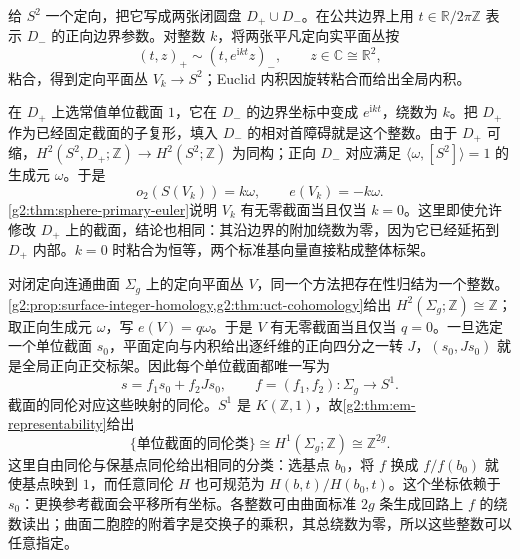 \begin{example}\label{g2:exm:clutched-plane-obstruction}
	给 \(S^2\) 一个定向，把它写成两张闭圆盘 \(D_+\cup D_-\)。在公共边界上用 \(t\in\mathbb R/2\pi\mathbb Z\) 表示 \(D_-\) 的正向边界参数。对整数 \(k\)，将两张平凡定向实平面丛按
	\[
		(t,z)_+\sim(t,e^{\mathrm i kt}z)_-,\qquad z\in\mathbb C\cong\mathbb R^2,
	\]
	粘合，得到定向平面丛 \(V_k\rightarrow S^2\)；Euclid 内积因旋转粘合而给出全局内积。

	在 \(D_+\) 上选常值单位截面 \(1\)，它在 \(D_-\) 的边界坐标中变成 \(e^{\mathrm i kt}\)，绕数为 \(k\)。把 \(D_+\) 作为已经固定截面的子复形，填入 \(D_-\) 的相对首障碍就是这个整数。由于 \(D_+\) 可缩，\(H^2(S^2,D_+;\mathbb Z)\rightarrow H^2(S^2;\mathbb Z)\) 为同构；正向 \(D_-\) 对应满足 \(\langle\omega,[S^2]\rangle=1\) 的生成元 \(\omega\)。于是
	\[
		o_2(S(V_k))=k\omega,\qquad e(V_k)=-k\omega.
	\]
	\cref{g2:thm:sphere-primary-euler}说明 \(V_k\) 有无零截面当且仅当 \(k=0\)。这里即使允许修改 \(D_+\) 上的截面，结论也相同：其沿边界的附加绕数为零，因为它已经延拓到 \(D_+\) 内部。\(k=0\) 时粘合为恒等，两个标准基向量直接粘成整体标架。
\end{example}

对闭定向连通曲面 \(\Sigma_g\) 上的定向平面丛 \(V\)，同一个方法把存在性归结为一个整数。\cref{g2:prop:surface-integer-homology,g2:thm:uct-cohomology}给出 \(H^2(\Sigma_g;\mathbb Z)\cong\mathbb Z\)；取正向生成元 \(\omega\)，写 \(e(V)=q\omega\)。于是 \(V\) 有无零截面当且仅当 \(q=0\)。一旦选定一个单位截面 \(s_0\)，平面定向与内积给出逐纤维的正向四分之一转 \(J\)，\((s_0,Js_0)\) 就是全局正向正交标架。因此每个单位截面都唯一写为
\[
	s=f_1s_0+f_2Js_0,\qquad f=(f_1,f_2):\Sigma_g\longrightarrow S^1.
\]
截面的同伦对应这些映射的同伦。\(S^1\) 是 \(K(\mathbb Z,1)\)，故\cref{g2:thm:em-representability}给出
\[
	\{\text{单位截面的同伦类}\}\cong H^1(\Sigma_g;\mathbb Z)\cong\mathbb Z^{2g}.
\]
这里自由同伦与保基点同伦给出相同的分类：选基点 \(b_0\)，将 \(f\) 换成 \(f/f(b_0)\) 就使基点映到 \(1\)，而任意同伦 \(H\) 也可规范为 \(H(b,t)/H(b_0,t)\)。这个坐标依赖于 \(s_0\)：更换参考截面会平移所有坐标。各整数可由曲面标准 \(2g\) 条生成回路上 \(f\) 的绕数读出；曲面二胞腔的附着字是交换子的乘积，其总绕数为零，所以这些整数可以任意指定。

